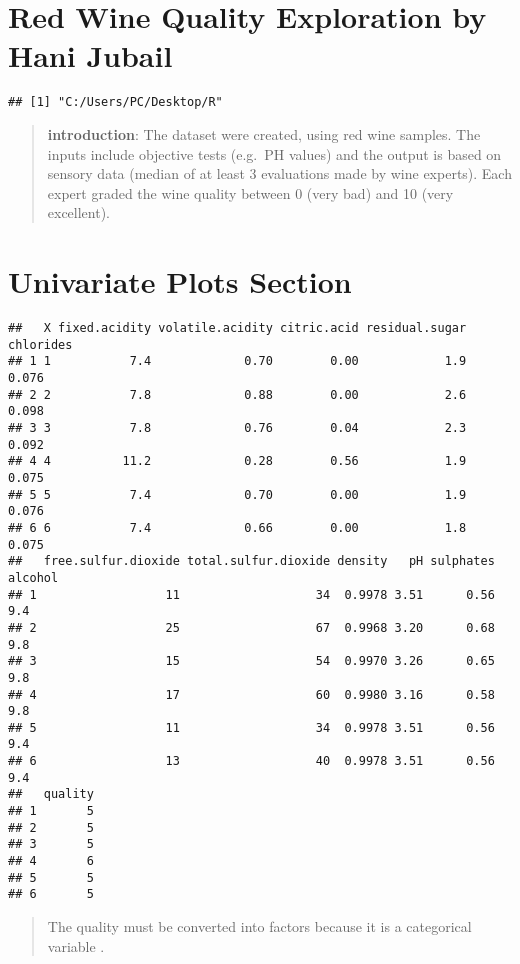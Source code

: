\documentclass[]{article}
\title{}
\author{}
\date{}
\begin{document}
\section{Red Wine Quality Exploration by Hani
Jubail}\label{red-wine-quality-exploration-by-hani-jubail}

\begin{verbatim}
## [1] "C:/Users/PC/Desktop/R"
\end{verbatim}

\begin{quote}
\textbf{introduction}: The dataset were created, using red wine samples.
The inputs include objective tests (e.g.~PH values) and the output is
based on sensory data (median of at least 3 evaluations made by wine
experts). Each expert graded the wine quality between 0 (very bad) and
10 (very excellent).
\end{quote}

\section{Univariate Plots Section}\label{univariate-plots-section}

\begin{verbatim}
##   X fixed.acidity volatile.acidity citric.acid residual.sugar chlorides
## 1 1           7.4             0.70        0.00            1.9     0.076
## 2 2           7.8             0.88        0.00            2.6     0.098
## 3 3           7.8             0.76        0.04            2.3     0.092
## 4 4          11.2             0.28        0.56            1.9     0.075
## 5 5           7.4             0.70        0.00            1.9     0.076
## 6 6           7.4             0.66        0.00            1.8     0.075
##   free.sulfur.dioxide total.sulfur.dioxide density   pH sulphates alcohol
## 1                  11                   34  0.9978 3.51      0.56     9.4
## 2                  25                   67  0.9968 3.20      0.68     9.8
## 3                  15                   54  0.9970 3.26      0.65     9.8
## 4                  17                   60  0.9980 3.16      0.58     9.8
## 5                  11                   34  0.9978 3.51      0.56     9.4
## 6                  13                   40  0.9978 3.51      0.56     9.4
##   quality
## 1       5
## 2       5
## 3       5
## 4       6
## 5       5
## 6       5
\end{verbatim}

\begin{quote}
The quality must be converted into factors because it is a categorical
variable .
\end{quote}
\end{document}
